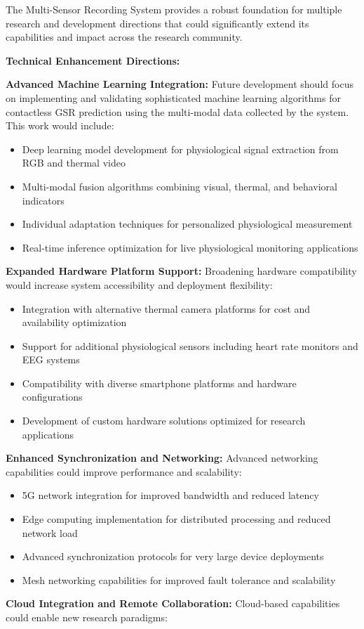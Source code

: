 \documentclass[12pt,a4paper]{report}
\begin{document}
The Multi-Sensor Recording System provides a robust foundation for multiple research and development directions that
could significantly extend its capabilities and impact across the research community.

\textbf{Technical Enhancement Directions:}

\textbf{Advanced Machine Learning Integration:}
Future development should focus on implementing and validating sophisticated machine learning algorithms for contactless
GSR prediction using the multi-modal data collected by the system. This work would include:

\begin{itemize}
\item Deep learning model development for physiological signal extraction from RGB and thermal video
\item Multi-modal fusion algorithms combining visual, thermal, and behavioral indicators
\item Individual adaptation techniques for personalized physiological measurement
\item Real-time inference optimization for live physiological monitoring applications

\end{itemize}
\textbf{Expanded Hardware Platform Support:}
Broadening hardware compatibility would increase system accessibility and deployment flexibility:

\begin{itemize}
\item Integration with alternative thermal camera platforms for cost and availability optimization
\item Support for additional physiological sensors including heart rate monitors and EEG systems
\item Compatibility with diverse smartphone platforms and hardware configurations
\item Development of custom hardware solutions optimized for research applications

\end{itemize}
\textbf{Enhanced Synchronization and Networking:}
Advanced networking capabilities could improve performance and scalability:

\begin{itemize}
\item 5G network integration for improved bandwidth and reduced latency
\item Edge computing implementation for distributed processing and reduced network load
\item Advanced synchronization protocols for very large device deployments
\item Mesh networking capabilities for improved fault tolerance and scalability

\end{itemize}
\textbf{Cloud Integration and Remote Collaboration:}
Cloud-based capabilities could enable new research paradigms:
\end{document}
